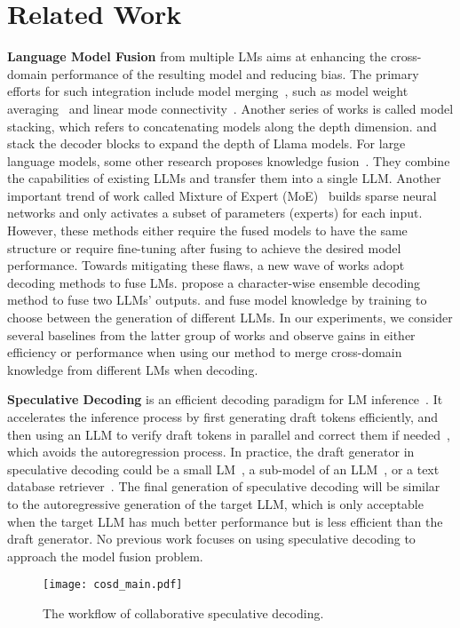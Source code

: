 \section{Related Work}
\textbf{Language Model Fusion} from multiple LMs aims at enhancing the cross-domain performance of the resulting model and reducing bias. The primary efforts for such integration include model merging~\citep{goddard2024arcee}, such as model weight averaging~\citep{wortsman2022model} and linear mode connectivity~\citep{ainsworth2022git, ito2024analysis, wang2020federated}. Another series of works is called model stacking, which refers to concatenating models along the depth dimension. \citet{wu2024llama} and \citet{kim2023solar} stack the decoder blocks to expand the depth of Llama models. For large language models, some other research proposes knowledge fusion~\citep{wan2024knowledge}. They combine the capabilities of existing LLMs and transfer them into a single LLM. Another important trend of work called Mixture of Expert (MoE)~\citep{zhu2024llama, xue2024openmoe} builds sparse neural networks and only activates a subset of parameters (\ie experts) for each input. However, these methods either require the fused models to have the same structure or require fine-tuning after fusing to achieve the desired model performance. Towards mitigating these flaws, a new wave of works adopt decoding methods to fuse LMs. \citet{gu2024chared} propose a character-wise ensemble decoding method to fuse two LLMs' outputs. \citet{shen2024learning} and \citet{wang2023fusing} fuse model knowledge by training to choose between the generation of different LLMs. In our experiments, we consider several baselines from the latter group of works and observe gains in either efficiency or performance when using our method to merge cross-domain knowledge from different LMs when decoding.

\textbf{Speculative Decoding} is an efficient decoding paradigm for LM inference~\citep{xia2024unlocking,stern2018blockwise,xia2023speculative}. It accelerates the inference process by first generating draft tokens efficiently, and then using an LLM to verify draft tokens in parallel and correct them if needed~\citep{leviathan2023fast}, which avoids the autoregression process. In practice, the draft generator in speculative decoding could be a small LM~\citep{chen2023accelerating,miao2023specinfer,zhou2023distillspec}, a sub-model of an LLM~\citep{zhang2023draft,yang2023predictive,elhoushi2024layer}, or a text database retriever~\citep{he2023rest,li2024nearest}. The final generation of speculative decoding will be similar to the autoregressive generation of the target LLM, which is only acceptable when the target LLM has much better performance but is less efficient than the draft generator. No previous work focuses on using speculative decoding to approach the model fusion problem.

\begin{figure*}[t]
    \centering  \texttt{[image: cosd\_main.pdf]}
    \vspace{-5mm}
    \caption{The workflow of collaborative speculative decoding.}
    \label{fig_main}
\end{figure*}